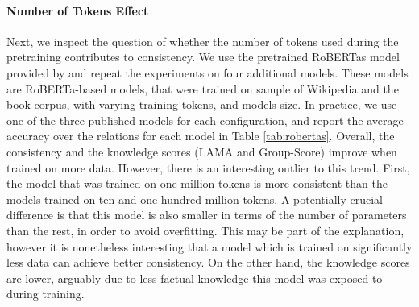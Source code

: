\paragraph{Number of Tokens Effect}
Next, we inspect the question of whether the number of tokens used during the pretraining contributes to consistency.
We use the pretrained RoBERTas model provided by \citet{robertas} and repeat the experiments on four additional models.
These models are RoBERTa-based models, that were trained on sample of Wikipedia and the book corpus, with varying training tokens, and models size. In practice, we use one of the three published models for each configuration, and report the average accuracy over the relations for each model in Table \ref{tab:robertas}.
Overall, the consistency and the knowledge scores (LAMA and Group-Score) improve when trained on more data. However, there is an interesting outlier to this trend.
First, the model that was trained on one million tokens is more consistent than the models trained on ten and one-hundred million tokens. A potentially crucial difference is that this model is also smaller in terms of the number of parameters than the rest, in order to avoid overfitting. This may be part of the explanation, however it is nonetheless interesting that a model which is trained on significantly less data can achieve better consistency. On the other hand, the knowledge scores are lower, arguably due to less factual knowledge this model was exposed to during training.




% 

% 





